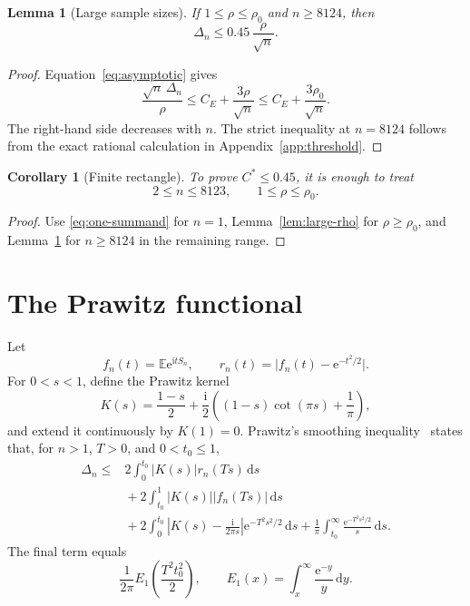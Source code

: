 \documentclass[11pt,a4paper,twoside]{article}
\newcommand{\manualtag}[1]{\tag{#1}}
\newtheorem{lemma}[theorem]{Lemma}
\newtheorem{corollary}[theorem]{Corollary}
\theoremstyle{remark}
\newcommand{\E}{\mathbb{E}}
\newcommand{\iu}{\mathrm{i}}
\newcommand{\e}{\mathrm{e}}
\newcommand{\dd}{\,\mathrm{d}}
\newcommand{\abs}[1]{\lvert#1\rvert}
\newcommand{\rhozero}{\rho_{0}}
\newcommand{\Cstar}{C^{\ast}}
\begin{document}
\begin{lemma}[Large sample sizes]\label{lem:large-n}
If \(1\le\rho\le\rhozero\) and \(n\ge8124\), then
\[
 \Delta_n\le0.45\,\frac{\rho}{\sqrt n}.
\]
\end{lemma}

\begin{proof}
Equation~\eqref{eq:asymptotic} gives
\[
 \frac{\sqrt n\,\Delta_n}{\rho}
 \le C_E+\frac{3\rho}{\sqrt n}
 \le C_E+\frac{3\rhozero}{\sqrt n}.
\]
The right-hand side decreases with \(n\).  The strict inequality at
\(n=8124\) follows from the exact rational calculation in
Appendix~\ref{app:threshold}.
\end{proof}

\begin{corollary}[Finite rectangle]\label{cor:finite-rectangle}
To prove \(\Cstar\le0.45\), it is enough to treat
\begin{equation}
 2\le n\le8123,
 \qquad
 1\le\rho\le\rhozero.
 \manualtag{5}\label{eq:finite-rectangle}
\end{equation}
\end{corollary}

\begin{proof}
Use \eqref{eq:one-summand} for \(n=1\),
Lemma~\ref{lem:large-rho} for \(\rho\ge\rhozero\), and
Lemma~\ref{lem:large-n} for \(n\ge8124\) in the remaining range.
\end{proof}

\section{The Prawitz functional}

Let
\[
 f_n(t)=\E\e^{\iu tS_n},
 \qquad
 r_n(t)=\abs{f_n(t)-\e^{-t^2/2}}.
\]
For \(0<s<1\), define the Prawitz kernel
\begin{equation}
 K(s)=
 \frac{1-s}{2}
 {}+\frac{\iu}{2}
 \left((1-s)\cot(\pi s)+\frac1\pi\right),
 \manualtag{6}\label{eq:kernel}
\end{equation}
and extend it continuously by \(K(1)=0\).
Prawitz's smoothing inequality~\cite{Prawitz1972,KorolevShevtsova2012}
states that, for \(n>1\), \(T>0\), and \(0<t_0\le1\),
\begin{equation}
\begin{aligned}
 \Delta_n\le{}&
 2\int_0^{t_0}\abs{K(s)}r_n(Ts)\dd s\\
 &{}+2\int_{t_0}^{1}\abs{K(s)}\abs{f_n(Ts)}\dd s\\
 &{}+2\int_0^{t_0}
 \left|K(s)-\frac{\iu}{2\pi s}\right|
 \e^{-T^2s^2/2}\dd s
 {}+\frac1\pi\int_{t_0}^{\infty}
 \frac{\e^{-T^2s^2/2}}{s}\dd s.
\end{aligned}
 \manualtag{7}\label{eq:prawitz}
\end{equation}
The final term equals
\[
 \frac{1}{2\pi}E_1\!\left(\frac{T^2t_0^2}{2}\right),
 \qquad
 E_1(x)=\int_x^\infty\frac{\e^{-y}}{y}\dd y.
\]
\end{document}
